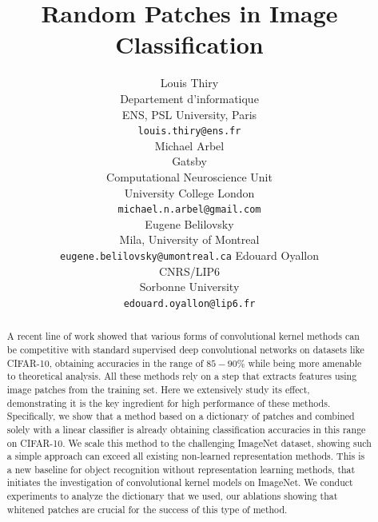 \documentclass{article}
\title{Random Patches in Image Classification}
\author{%
  Louis Thiry \\
  Departement d'informatique \\
  ENS, PSL University, Paris\\
  \texttt{louis.thiry@ens.fr} \\
  \And
  Michael Arbel\\
  Gatsby\\
  Computational Neuroscience Unit\\
  University College London\\
  \texttt{michael.n.arbel@gmail.com}\\
  \And
    Eugene Belilovsky\\
  Mila, University of Montreal\\
  \texttt{eugene.belilovsky@umontreal.ca}
  \And
  Edouard Oyallon \\
  CNRS/LIP6 \\
  Sorbonne University \\
  \texttt{edouard.oyallon@lip6.fr} \\
}
\begin{document}
\maketitle

\begin{abstract}
A recent line of work showed that  various forms of convolutional  kernel methods can be competitive with standard supervised deep convolutional networks on datasets like CIFAR-10, obtaining accuracies in the range of $85-90\%$ while being more amenable to theoretical analysis. All these methods rely on a step that extracts features using image patches from the training set. Here we extensively study its effect, demonstrating it is the key ingredient for high performance of these methods. Specifically, we show that a method based on a dictionary of patches and combined solely with a linear classifier is already obtaining classification accuracies in this range on CIFAR-10. We scale this method to the challenging ImageNet dataset, showing such a simple approach can exceed all existing non-learned representation methods. This is a new baseline for object recognition without representation learning methods, that  initiates the investigation of  convolutional kernel models  on ImageNet. We conduct experiments to analyze the dictionary that we used, our ablations showing that whitened patches are crucial for the success of this  type of method. 

 
\end{abstract}
\end{document}
